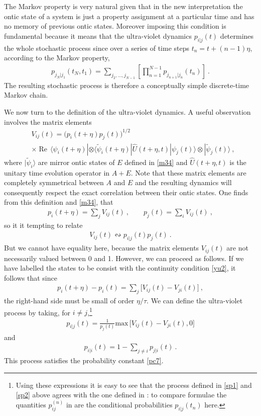 \documentclass[%
preprint,
nofootinbib,
 amsmath,amssymb,
aps,
]{revtex4-1}
\newcommand{\RE}{\operatorname{Re}}
\def\bra#1{\langle #1|}
\def\ket#1{| #1\rangle}
\newcommand{\EQ}[1]{\begin{equation}\begin{split} #1
\end{split}\end{equation}}
\begin{document}
The Markov property is very natural given that 
in the new interpretation  the ontic state of a system is just a property assignment at a particular time and has no memory of previous ontic states. Moreover imposing this condition is fundamental because it means that the ultra-violet dynamics $p_{i|j}(t)$ determines the whole stochastic process since over a series of time steps $t_n=t+(n-1)\eta$, according to the Markov property,
\EQ{
p_{j_N|j_1}(t_N,t_1)=\sum_{j_2,\ldots,j_{N-1}}\left[\prod_{n=1}^{N-1}p_{j_{n+1}|j_n}(t_n)\right]\ .
\label{s99}
}
The resulting stochastic process is therefore a conceptually simple discrete-time Markov chain. 

We now turn to the definition of the ultra-violet dynamics.
A useful observation involves the matrix elements
\EQ{
&V_{ij}(t)=\big(p_i(t+\eta)p_j(t)\big)^{1/2}\\ &\times\RE\,\bra{\psi_i(t+\eta)}\otimes\bra{\tilde\psi_i(t+\eta)}\hat U(t+\eta,t)\ket{\psi_j(t)}\otimes\ket{\tilde\psi_j(t)}\ ,
\label{jxx}
}
where $\ket{\tilde\psi_i}$ are mirror ontic states of $E$ defined in \eqref{m34} and $\hat U(t+\eta,t)$ is the unitary time evolution operator in $A+E$. Note that these matrix elements are completely symmetrical between $A$ and $E$ and the resulting dynamics will consequently respect the exact correlation between their ontic states.
One finds from this definition and \eqref{m34}, that
\EQ{
p_i(t+\eta)=\sum_jV_{ij}(t)\ ,\qquad
p_j(t)=\sum_iV_{ij}(t)\ ,
\label{pp2}
}
so it it tempting to relate
\EQ{
V_{ij}(t)\leftrightsquigarrow p_{i|j}(t)p_j(t)\ .
}
But we cannot have equality here, because the matrix elements $V_{ij}(t)$ are not necessarily valued between 0 and 1. However, we can proceed as follows.
If we have labelled the states to be consist with the continuity condition \eqref{yu2}, it follows that since 
\EQ{
p_i(t+\eta)-p_i(t)=\sum_j\big[V_{ij}(t)-V_{ji}(t)\big]\ ,
\label{bx3}
}
the right-hand side must be small of order $\eta/\tau $.
We can define the ultra-violet process by taking, for $i\neq j$,\footnote{Using these expressions it is easy to see that the process defined in \eqref{sp1} and \eqref{sp2} above agrees with the one defined in \cite{Hollowood:2013cbr}: to compare formulae the quantities $p_{ij}^{(n)}$ in \cite{Hollowood:2013cbr} are the conditional probabilities $p_{i|j}(t_n)$ here.}
\EQ{
p_{i|j}(t)=\frac1{p_j(t)}\text{max}\,\Big[V_{ij}(t)-V_{ji}(t),0\Big]
\label{sp1}
}
and
\EQ{
p_{i|i}(t)=1-\sum_{j\neq i}p_{j|i}(t)\ .
\label{sp2}
}
This process satisfies the probability constant \eqref{pc7}.
\end{document}
